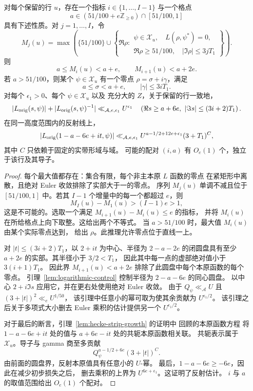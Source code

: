 \begin{lemma}[带缓冲的无零点分箱]\label{lem:buffered-bins}
对每个保留的行 \(u\)，存在一个指标 \(i\in\{1,\ldots,I-1\}\)
与一个格点
\[
 a\in(51/100+e\mathbb Z_{\ge0})\cap[51/100,1]
\]
具有下述性质。对 \(j=1,\ldots,I\)，令
\[
 M_j(u)=\max\left(\{51/100\}\cup
 \left\{\Re\rho:
 \begin{array}{l}
  \psi\in\mathcal X_u,\quad L(\rho,\psi^*)=0,\\
  \Re\rho\ge51/100,\quad |\Im\rho|\le3jT_1
 \end{array}\right\}\right).
\]
则
\[
 a\le M_i(u)<a+e,\qquad M_{i+1}(u)<a+2e.
\]
若 \(a>51/100\)，则某个 \(\psi\in\mathcal X_u\) 有一个零点
\(\rho=\sigma+i\gamma\)，满足
\[
 a\le\sigma<a+e,\qquad |\gamma|\le3iT_1.
\]
对每个 \(\epsilon_1>0\)、每个 \(\psi\in\mathcal X_u\) 以及
充分大的 \(Z\)，关于保留的行一致地，
\[
 |L_{\rm orig}(s,\psi)|+|L_{\rm orig}(s,\psi)^{-1}|
 \ll_{\mathcal A,e,\epsilon_1} U^{\epsilon_1}
 \quad
 \left(\Re s\ge a+6e,\ |\Im s|\le(3i+2)T_1\right).
\]
在同一高度范围内的反射线上，
\[
 |L_{\rm orig}(1-a-6e+it,\psi)|
 \ll_{\mathcal A,e,\epsilon_1}
 U^{a-1/2+12e+\epsilon_1}(3+T_1)^C,
\]
其中 \(C\) 只依赖于固定的实带形域与域。
可能的配对 \((i,a)\) 有 \(O_e(1)\) 个，独立于该行及其导子。
\end{lemma}

\begin{proof}
每个最大值都存在：集合有限，每个非主本原 \(L\) 函数的零点
在紧矩形中离散，且绝对 Euler 收敛排除了实部大于一的零点。
序列 \(M_j(u)\) 单调不减且位于 \([51/100,1]\) 中。若其
\(I-1\) 个增量中的每一个都超过 \(e\)，则
\[
 M_I(u)-M_1(u)>(I-1)e>1,
\]
这是不可能的。选取一个满足 \(M_{i+1}(u)-M_i(u)\le e\) 的指标，
并将 \(M_i(u)\) 在所给格点上向下取整。这给出两个不等式。
当 \(a>51/100\) 时，最大值 \(M_i(u)\) 由某个实际零点达到，
给出 \(\rho\)。此推理允许零点位于直线一上。

对 \(|t|\le(3i+2)T_1\)，以 \(2+it\) 为中心、半径为 \(2-a-2e\)
的闭圆盘具有至少 \(a+2e\) 的实部。其半径小于 \(3/2<T_1\)，
因此其中每一点的虚部绝对值小于 \(3(i+1)T_1\)。
因此界 \(M_{i+1}(u)<a+2e\) 排除了此圆盘中每个本原函数的每个零点。
引理~\ref{lem:logarithmic-control} 控制半径为 \(2-a-6e\) 的同心圆盘。
以中心 \(2+i\Im s\) 应用它，并在更右处使用绝对 Euler 收敛。
由于 \(Q_\psi\ll_{\mathcal A}U\) 且 \((3+|t|)^2\ll_e U^{1/50}\)，
该引理中任意小的幂可取为使其余贡献为 \(U^{\epsilon_1/2}\)。
该引理之后关于多项式大小删去 Euler 乘积的估计提供另一个
\(U^{\epsilon_1/2}\)。

对于最后的断言，引理~\ref{lem:hecke-strip-growth} 的证明中
回顾的本原函数方程 \cite[方程 (1.1)]{GZ} 将
\(1-a-6e+it\) 处的值与 \(a+6e-it\) 处的共轭本原函数相关联。
共轭表示属于 \(\mathcal X_u\)。导子与 gamma 商至多贡献
\[
 Q_\psi^{a-1/2+6e}(3+|t|)^C.
\]
由前面的圆盘界，反射本原值具有任意小的 \(U\)-幂。
最后，\(1-a-6e\ge-6e\)，因此在减少初步损失之后，
删去乘积的上界为 \(U^{6e+\epsilon_1}\)。这证明了反射估计。
\(i\) 与 \(a\) 的取值范围给出 \(O_e(1)\) 个配对。
\end{proof}

